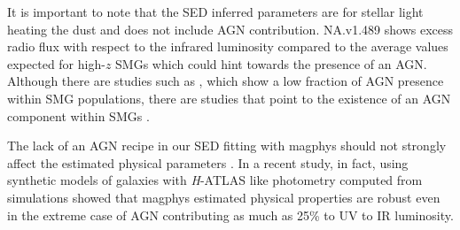 \documentclass[iop,apj,useAMS,usenatbib]{emulateapj-rtx4}
\begin{document}
It is important to note that the SED inferred parameters are for
stellar light heating the dust and does not include AGN
contribution. NA.v1.489 shows excess radio flux with respect to the
infrared luminosity compared to the average values expected for
high-$z$ SMGs which could hint towards the presence of an
AGN. Although there are studies such as \citet{Wang2013}, which show a
low fraction of AGN presence within SMG populations, there are studies
that point to the existence of an AGN component within SMGs \citep{Wang2013}.

The lack of an AGN recipe in our SED fitting with {\sc magphys} should not strongly
affect the estimated physical parameters \citep{Cunha2015}. In a recent study, in fact, using
synthetic models of galaxies with {\it H}-ATLAS like photometry
computed from simulations \citet{Hayward2015} showed that {\sc magphys}
estimated physical properties are robust even in the extreme case of
AGN contributing as much as 25\% to UV to IR luminosity.
\end{document}
